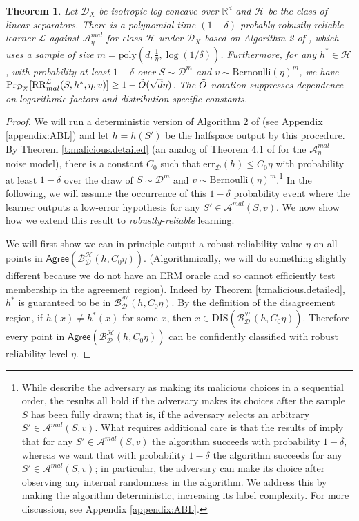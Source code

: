 \documentclass[11pt]{article}
\newcommand{\CR}{\text{RR}}
\newtheorem{theorem}{Theorem}[section]
\newcommand{\R}{\mathbb{R}}
\newcommand{\0}{\mathbf{0}}
\newcommand{\1}{\mathbf{1}}
\newcommand{\cA}{\mathcal{A}}
\newcommand{\cB}{\mathcal{B}}
\newcommand{\cD}{\mathcal{D}}
\newcommand{\cH}{\mathcal{H}}
\newcommand{\cL}{\mathcal{L}}
\newcommand{\Agree}{\mathsf{Agree}}
\begin{document}
\begin{theorem}\label{lem:abl}
Let $\cD_X$ be isotropic log-concave over $\R^d$ and $\cH$ be the class of linear separators.
There is a polynomial-time $(1-\delta)$-probably robustly-reliable learner $\cL$ against $\cA_\eta^{mal}$ for class $\cH$ under $\cD_X$ based on Algorithm 2 of \cite{awasthi2017power}, which uses a sample of size $m=\text{poly}(d, \frac{1}{\eta}
, \log(1/\delta))$.
Furthermore, for any $h^* \in \cH$, with probability at least $1-\delta$ over $S\sim\cD^m$ and $v \sim \mbox{Bernoulli}(\eta)^m$, we have
$\Pr_{\cD_X}[\CR^{\cL}_{mal}(S,h^*,\eta,v)] \geq 1-\Tilde{O}(\sqrt{d}\eta)$.
The $\Tilde{O}$-notation suppresses dependence on logarithmic factors and distribution-specific constants.
\end{theorem}

\begin{proof} We will run a deterministic version of Algorithm 2 of \cite{awasthi2017power} (see Appendix \ref{appendix:ABL}) and let $h = h(S')$ be the halfspace output by this procedure. By Theorem \ref{t:malicious.detailed} (an analog of Theorem 4.1 of \cite{awasthi2017power} for the $\cA_\eta^{mal}$ noise model), there is a constant $C_0$ such that $\text{err}_\cD(h)\le C_0\eta$ with probability at least $1-\delta$ over the draw of $S\sim\cD^m$ and $v \sim \mbox{Bernoulli}(\eta)^m$.\footnote{While \cite{awasthi2017power} describe the adversary as making its malicious choices in a sequential order, the results all hold if the adversary makes its choices after the sample $S$ has been fully drawn; that is, if the adversary selects an arbitrary $S' \in \cA^{mal}(S,v)$. What requires additional care is that the results of \cite{awasthi2017power} imply that for any $S' \in \cA^{mal}(S,v)$ the algorithm succeeds with probability $1-\delta$, whereas we want that with probability $1-\delta$ the algorithm succeeds for any $S' \in \cA^{mal}(S,v)$; in particular, the adversary can make its choice after observing any internal randomness in the algorithm. We address this by making the algorithm deterministic, increasing its label complexity. For more discussion, see Appendix \ref{appendix:ABL}.} In the following, we will assume the occurrence of this $1-\delta$ probability event where the learner outputs a low-error hypothesis for any $S' \in \cA^{mal}(S,v)$. We now show how we extend this result to {\em robustly-reliable} learning.

We will first show we can in principle output a robust-reliability value $\eta$ on all points in $\Agree(\cB^{\cH}_{\cD}(h,C_0\eta))$. (Algorithmically, we will do something slightly different because we do not have an ERM oracle and so cannot efficiently test membership in the agreement region). Indeed by Theorem \ref{t:malicious.detailed}, $h^*$ is guaranteed to be in $\cB^{\cH}_{\cD}(h,C_0\eta)$. By the definition of the disagreement region, if $h(x)\ne h^*(x)$ for some $x$, then $x\in \text{DIS}(\cB^{\cH}_{\cD}(h,C_0\eta))$. Therefore every point in $\Agree(\cB^{\cH}_{\cD}(h,C_0\eta))$ can be confidently classified with robust reliability level $\eta$.


\end{proof}
\end{document}
